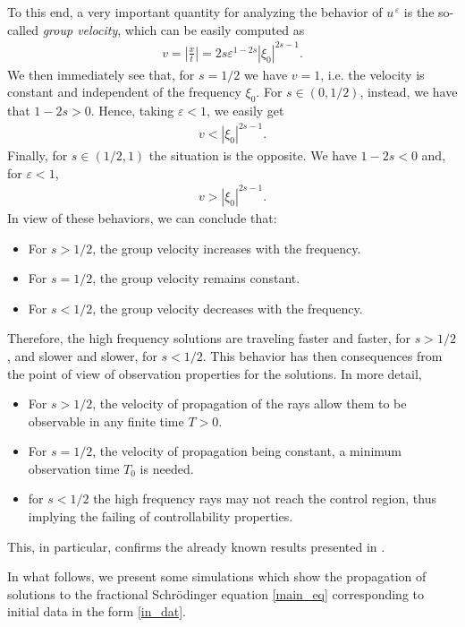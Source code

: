 \documentclass[10pt]{article}
\newcommand{\ue}[1]{#1^{\,\varepsilon}}
\begin{document}
To this end, a very important quantity for analyzing the behavior of $\ue{u}$ is the so-called \textit{group velocity}, which can be easily computed as 
\begin{align*}
	v=\left|\frac xt\right| = 2s\varepsilon^{1-2s}|\xi_0|^{2s-1}.
\end{align*}
We then immediately see that, for $s=1/2$ we have $v=1$, i.e. the velocity is constant and independent of the frequency $\xi_0$. For $s\in(0,1/2)$, instead, we have that $1-2s>0$. Hence, taking $\varepsilon<1$, we easily get
\begin{align*}
v<|\xi_0|^{2s-1}.
\end{align*}
Finally, for $s\in(1/2,1)$ the situation is the opposite. We have $1-2s<0$ and, for $\varepsilon<1$, 
\begin{align*}
v>|\xi_0|^{2s-1}.
\end{align*}
In view of these behaviors, we can conclude that:
\begin{itemize}
	\item For $s> 1/2$, the group velocity increases with the frequency.
	
	\item For $s=1/2$, the group velocity remains constant.
	
	\item For $s<1/2$, the group velocity decreases with the frequency.
\end{itemize}

Therefore, the high frequency solutions are traveling faster and faster, for $s>1/2$, and slower and slower, for $s<1/2$. This behavior has then consequences from the point of view of observation properties for the solutions. In more detail,
\begin{itemize}
	\item For $s>1/2$, the velocity of propagation of the rays allow them to be observable in any finite time $T>0$.
	\item For $s=1/2$, the velocity of propagation being constant, a minimum observation time $T_0$ is needed.
	\item for $s<1/2$ the high frequency rays may not reach the control region, thus implying the failing of controllability properties. 
\end{itemize}
This, in particular, confirms the already known results presented in \cite{biccari2014internal}.

In what follows, we present some simulations which show the propagation of solutions to the fractional Schr\"odinger equation \cref{main_eq} corresponding to initial data in the form \cref{in_dat}. 
\end{document}
